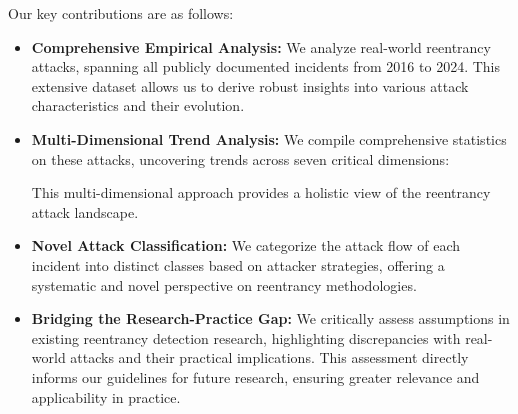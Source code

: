 Our key contributions are as follows:

\begin{itemize}
    \item \textbf{Comprehensive Empirical Analysis:} We analyze \ReentrancyTotalAnalyzed{} real-world reentrancy attacks, spanning all publicly documented incidents from 2016 to 2024. This extensive dataset allows us to derive robust insights into various attack characteristics and their evolution.
    \item \textbf{Multi-Dimensional Trend Analysis:} We compile comprehensive statistics on these attacks, uncovering trends across seven critical dimensions:
    This multi-dimensional approach provides a holistic view of the reentrancy attack landscape.
    \item \textbf{Novel Attack Classification:} We categorize the attack flow of each incident into distinct classes based on attacker strategies, offering a systematic and novel perspective on reentrancy methodologies.
    \item \textbf{Bridging the Research-Practice Gap:} We critically assess assumptions in existing reentrancy detection research, highlighting discrepancies with real-world attacks and their practical implications. This assessment directly informs our guidelines for future research, ensuring greater relevance and applicability in practice.
\end{itemize}

